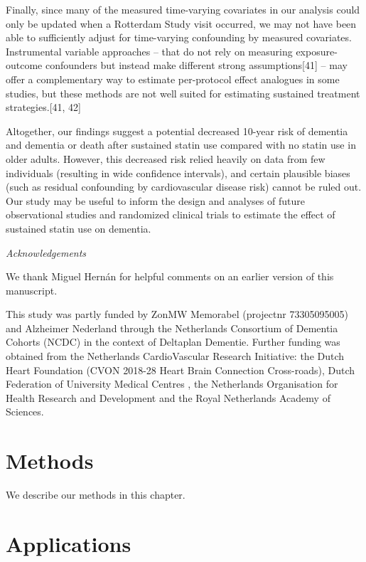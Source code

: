 \documentclass[
]{book}
\begin{document}
Finally, since many of the measured time-varying covariates in our analysis could only be
updated when a Rotterdam Study visit occurred, we may not have been able to sufficiently adjust for time-varying confounding by measured covariates. Instrumental variable approaches -- that do not rely on measuring exposure-outcome confounders but instead make different strong assumptions{[}41{]} -- may offer a complementary way to estimate per-protocol effect analogues in some studies, but these methods are not well suited for estimating sustained treatment strategies.{[}41, 42{]}

Altogether, our findings suggest a potential decreased 10-year risk of dementia and dementia or death after sustained statin use compared with no statin use in older adults. However, this decreased risk relied heavily on data from few individuals (resulting in wide confidence intervals), and certain plausible biases (such as residual confounding by cardiovascular disease risk) cannot be ruled out. Our study may be useful to inform the design and analyses of future observational studies and randomized clinical trials to estimate the effect of sustained statin use on dementia.

\emph{Acknowledgements}

We thank Miguel Hernán for helpful comments on an earlier version of this manuscript.

This study was partly funded by ZonMW Memorabel (projectnr 73305095005) and Alzheimer Nederland through the Netherlands Consortium of Dementia Cohorts (NCDC) in the context of Deltaplan Dementie. Further funding was obtained from the Netherlands CardioVascular Research Initiative: the Dutch Heart Foundation (CVON 2018-28 Heart Brain Connection Cross-roads), Dutch Federation of University Medical Centres , the Netherlands Organisation for Health Research and Development and the Royal Netherlands Academy of Sciences.

\hypertarget{chapter3}{%
\chapter{Methods}\label{chapter3}}

We describe our methods in this chapter.

\hypertarget{chapter4}{%
\chapter{Applications}\label{chapter4}}
\end{document}

